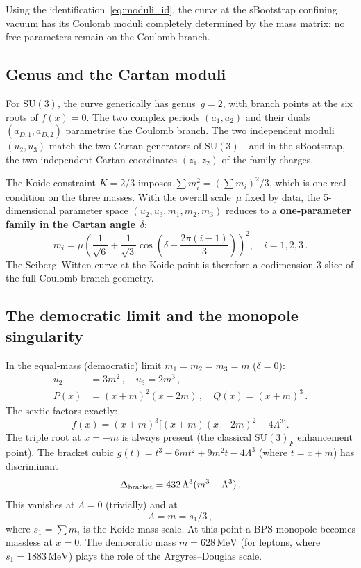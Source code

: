 \documentclass[aps,prd,twocolumn,showpacs,preprintnumbers,superscriptaddress,floatfix]{revtex4-2}
\newcommand{\SU}{\mathrm{SU}}
\newcommand{\MeV}{\,\mathrm{MeV}}
\begin{document}
Using the identification~\eqref{eq:moduli_id}, the curve at the
sBootstrap confining vacuum has its Coulomb moduli completely
determined by the mass matrix: no free parameters remain on the
Coulomb branch.


\subsection{Genus and the Cartan moduli}

For $\SU(3)$, the curve generically has genus~$g = 2$, with branch
points at the six roots of $f(x) = 0$.
The two complex periods $(a_1, a_2)$ and their duals
$(a_{D,1}, a_{D,2})$ parametrise the Coulomb branch.
The two independent moduli $(u_2, u_3)$ match the two Cartan
generators of $\SU(3)$---and in the sBootstrap, the two independent
Cartan coordinates $(z_1, z_2)$ of the family charges.

The Koide constraint $K = 2/3$ imposes
$\sum m_i^2 = (\sum m_i)^2/3$, which is one real condition on the
three masses.
With the overall scale~$\mu$ fixed by data,
the 5-dimensional parameter space
$(u_2, u_3, m_1, m_2, m_3)$ reduces to a
\textbf{one-parameter family in the Cartan angle}~$\delta$:
\begin{equation}
  m_i = \mu\left(\frac{1}{\sqrt{6}}
  + \frac{1}{\sqrt{3}}\cos\!\left(\delta
  + \frac{2\pi(i-1)}{3}\right)\right)^{\!2},
  \quad i = 1,2,3\,.
  \label{eq:mi_delta}
\end{equation}
The Seiberg--Witten curve at the Koide point is therefore a
codimension-3 slice of the full Coulomb-branch geometry.


\subsection{The democratic limit and the monopole singularity}

In the equal-mass (democratic) limit $m_1 = m_2 = m_3 = m$
($\delta = 0$):
\begin{align}
  u_2 &= 3m^2\,,\quad u_3 = 2m^3\,,\\
  P(x) &= (x+m)^2(x - 2m)\,,\quad Q(x) = (x+m)^3\,.
\end{align}
The sextic factors exactly:
\begin{equation}
  f(x) = (x+m)^3\bigl[(x+m)(x-2m)^2 - 4\Lambda^3\bigr].
  \label{eq:dem_factor}
\end{equation}
The triple root at $x = -m$ is always present (the classical
$\SU(3)_F$ enhancement point).
The bracket cubic $g(t) = t^3 - 6mt^2 + 9m^2t - 4\Lambda^3$
(where $t = x + m$) has discriminant
\begin{equation}
  \Delta_{\rm bracket}
  = 432\,\Lambda^3(m^3 - \Lambda^3)\,.
  \label{eq:Delta_bracket}
\end{equation}
This vanishes at $\Lambda = 0$ (trivially) and at
\begin{equation}
  \boxed{\Lambda = m = s_1/3\,,}
  \label{eq:dem_sing}
\end{equation}
where $s_1 = \sum m_i$ is the Koide mass scale.
At this point a BPS monopole becomes massless at $x = 0$.
The democratic mass $m = 628\MeV$ (for leptons, where
$s_1 = 1883\MeV$) plays the role of the
Argyres--Douglas scale.
\end{document}
